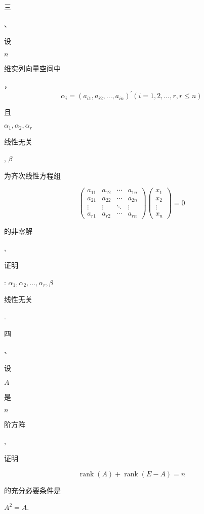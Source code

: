 \documentclass[10pt]{article}
\begin{document}
\begin{CJK}{UTF8}{mj}三\end{CJK}、\begin{CJK}{UTF8}{mj}设\end{CJK} $n$ \begin{CJK}{UTF8}{mj}维实列向量空间中\end{CJK}，
$$
\alpha_{i}=\left(a_{i 1}, a_{i 2}, \ldots, a_{i n}\right)^{\prime}(i=1,2, \ldots, r, r \leq n)
$$
\begin{CJK}{UTF8}{mj}且\end{CJK} $\alpha_{1}, \alpha_{2}, \alpha_{r}$ \begin{CJK}{UTF8}{mj}线性无关\end{CJK}, $\beta$ \begin{CJK}{UTF8}{mj}为齐次线性方程组\end{CJK}
$$
\left(\begin{array}{cccc}
a_{11} & a_{12} & \cdots & a_{1 n} \\
a_{21} & a_{22} & \cdots & a_{2 n} \\
\vdots & \vdots & \ddots & \vdots \\
a_{r 1} & a_{r 2} & \cdots & a_{r n}
\end{array}\right)\left(\begin{array}{c}
x_{1} \\
x_{2} \\
\vdots \\
x_{n}
\end{array}\right)=0
$$
\begin{CJK}{UTF8}{mj}的非零解\end{CJK}, \begin{CJK}{UTF8}{mj}证明\end{CJK}: $\alpha_{1}, \alpha_{2}, \ldots, \alpha_{r}, \beta$ \begin{CJK}{UTF8}{mj}线性无关\end{CJK}.

\begin{CJK}{UTF8}{mj}四\end{CJK}、\begin{CJK}{UTF8}{mj}设\end{CJK} $A$ \begin{CJK}{UTF8}{mj}是\end{CJK} $n$ \begin{CJK}{UTF8}{mj}阶方阵\end{CJK}, \begin{CJK}{UTF8}{mj}证明\end{CJK}
$$
\operatorname{rank}(A)+\operatorname{rank}(E-A)=n
$$
\begin{CJK}{UTF8}{mj}的充分必要条件是\end{CJK} $A^{2}=A$.
\end{document}

